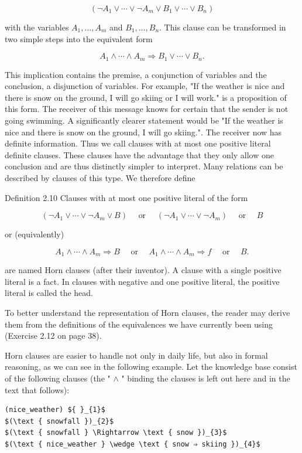 \documentclass[10pt]{article}
\begin{document}
$$
\left(\neg A_{1} \vee \cdots \vee \neg A_{m} \vee B_{1} \vee \cdots \vee B_{n}\right)
$$

with the variables $A_{1}, \ldots, A_{m}$ and $B_{1}, \ldots, B_{n}$. This clause can be transformed in two simple steps into the equivalent form

$$
A_{1} \wedge \cdots \wedge A_{m} \Rightarrow B_{1} \vee \cdots \vee B_{n} .
$$

This implication contains the premise, a conjunction of variables and the conclusion, a disjunction of variables. For example, "If the weather is nice and there is snow on the ground, I will go skiing or I will work." is a proposition of this form. The receiver of this message knows for certain that the sender is not going swimming. A significantly clearer statement would be "If the weather is nice and there is snow on the ground, I will go skiing.". The receiver now has definite information. Thus we call clauses with at most one positive literal definite clauses. These clauses have the advantage that they only allow one conclusion and are thus distinctly simpler to interpret. Many relations can be described by clauses of this type. We therefore define

Definition 2.10 Clauses with at most one positive literal of the form

$$
\left(\neg A_{1} \vee \cdots \vee \neg A_{m} \vee B\right) \quad \text { or } \quad\left(\neg A_{1} \vee \cdots \vee \neg A_{m}\right) \quad \text { or } \quad B
$$

or (equivalently)

$$
A_{1} \wedge \cdots \wedge A_{m} \Rightarrow B \quad \text { or } \quad A_{1} \wedge \cdots \wedge A_{m} \Rightarrow f \quad \text { or } \quad B .
$$

are named Horn clauses (after their inventor). A clause with a single positive literal is a fact. In clauses with negative and one positive literal, the positive literal is called the head.

To better understand the representation of Horn clauses, the reader may derive them from the definitions of the equivalences we have currently been using (Exercise 2.12 on page 38).

Horn clauses are easier to handle not only in daily life, but also in formal reasoning, as we can see in the following example. Let the knowledge base consist of the following clauses (the " $\wedge$ " binding the clauses is left out here and in the text that follows):

\begin{verbatim}
(nice_weather) ${ }_{1}$
$(\text { snowfall })_{2}$
$(\text { snowfall } \Rightarrow \text { snow })_{3}$
$(\text { nice_weather } \wedge \text { snow ⇒ skiing })_{4}$
\end{verbatim}
\end{document}

